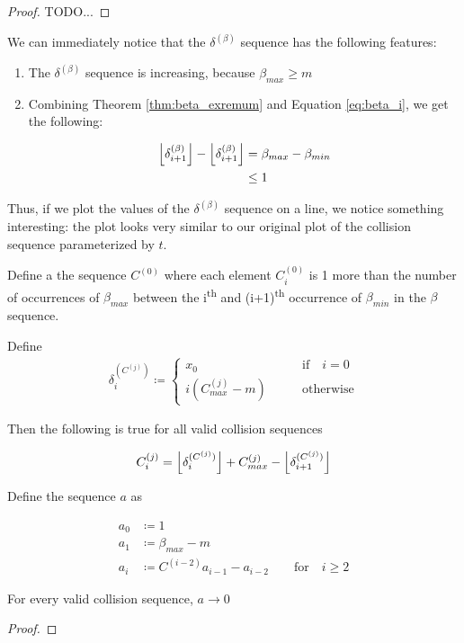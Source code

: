 \begin{proof}
	TODO...
\end{proof}

We can immediately notice that the $\delta^{(\beta)}$ sequence has the following features:

\begin{enumerate}
	\item The $\delta^{(\beta)}$ sequence is increasing, because $\beta_{max} \ge m$
	\item Combining Theorem \ref{thm:beta_exremum} and Equation \ref{eq:beta_i}, we get the following:

		\begin{align}
			\floor{\delta^{(\beta)}_{i+1}} - \floor{\delta^{(\beta)}_{i+1}}& = \beta_{max} - \beta_{min}\\
			& \le 1
		\end{align}
\end{enumerate}

Thus, if we plot the values of the $\delta^{(\beta)}$ sequence on a line, we notice something interesting: the plot looks very similar to our original plot of the collision sequence parameterized by $t$.

\begin{definition}
	Define a the sequence $C^{(0)}$ where each element $C^{(0)}_i$ is 1 more than the number of occurrences of $\beta_{max}$ between the i\textsuperscript{th} and (i+1)\textsuperscript{th} occurrence of $\beta_{min}$ in the $\beta$ sequence.
\end{definition} 

\begin{theorem}
	Define 
	\begin{align}\label{delta_c}
			\delta^{(C^{(j)})}_i \coloneqq \begin{cases}
				x_0 \qquad &\text{if} \quad i = 0\\
				i (C^{(j)}_{max} - m) \qquad &\text{otherwise}
			\end{cases}
	\end{align}

	Then the following is true for all valid collision sequences

	\begin{align}\label{eq:c_i}
		C^{(j)}_i = \floor{\delta^{(C^{(j)})}_i} + C^{(j)}_{max} - \floor{\delta^{(C^{(j)})}_{i+1}}
	\end{align}
\end{theorem} 

\begin{theorem}
	Define the sequence $a$ as

	\begin{align}
		a_0& \coloneqq 1\\
		a_1& \coloneqq \beta_{max} - m\\
		a_i& \coloneqq C^{(i-2)} a_{i-1} - a_{i-2} \qquad \text{for} \quad i \ge 2
	\end{align}

	For every valid collision sequence, $a \to 0$
\end{theorem}

\begin{proof}

\end{proof}
